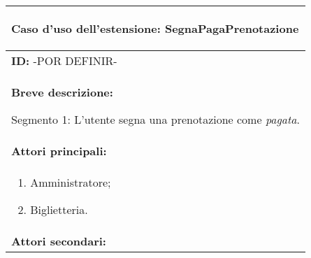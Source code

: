 \documentclass{article}
\begin{document}
\begin{table}[t]
    \centering
    \begin{tabular}{|p{\linewidth}|}
        \hline
        \cellcolor{gray!100}
        \color{white}
        \begin{center}
            \textbf{Caso d'uso dell'estensione:} SegnaPagaPrenotazione
        \end{center} \\
        \hline
        \textbf{ID:} -POR DEFINIR- \\
        \hline
        \cellcolor{gray!20}
        \textbf{Breve descrizione:}
        
        Segmento 1: L'utente segna una prenotazione come \emph{pagata}. \\
        \hline
        \textbf{Attori principali:} \\
        \begin{minipage}{\linewidth}
            \begin{enumerate}[noitemsep]
                \item Amministratore;
                \item Biglietteria.
            \end{enumerate}
        \end{minipage}
        \vspace{-5pt} \\
        \hline
        \textbf{Attori secondari:}
        

\end{tabular}
\end{table}
\end{document}

